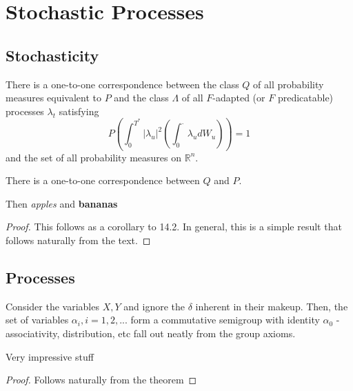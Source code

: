 \chapter{Stochastic Processes}

\section{Stochasticity}
\begin{defn}
  There is a one-to-one correspondence between the class $Q$ of all
  probability measures equivalent to $P$ and the class $\Lambda$ of
  all $F$-adapted (or $F$ predicatable) processes $\lambda_{t}$
  satisfying
  \begin{equation}
    P \left(\int_{0}^{T^{*}} |\lambda_{u}|^{2} \left(\int_{0}^{\cdot}
        \lambda_{u} dW_{u} \right) \right) = 1
  \end{equation}
  and the set of all probability measures on $\mathbb{R}^{n}$.
\end{defn}

\begin{thm}
  There is a one-to-one correspondence between $Q$ and $P$. 
\end{thm}

Then \emph{apples} and \textbf{bananas}

\begin{proof}
  This follows as a corollary to 14.2.  In general, this is a simple
  result that follows naturally from the text.
\end{proof}

\section{Processes}
\label{sec:processes}

Consider the variables $X, Y$ and ignore the $\delta$ inherent in
their makeup. Then, the set of variables $\alpha_{i}, i = 1, 2, ...$
form a commutative semigroup with identity $\alpha_{0}$ -
associativity, distribution, etc fall out neatly from the group
axioms.

\begin{defn}
  Very impressive stuff
\end{defn}

\begin{proof}
  Follows naturally from the theorem
\end{proof}

